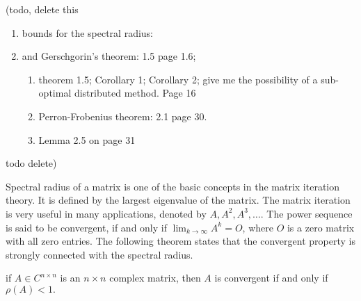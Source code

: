 (todo, delete this
\begin{enumerate}
\item bounds for the spectral radius: 
\item and Gerschgorin's theorem: 1.5 page 1.6; 

\begin{enumerate}
\item theorem 1.5; Corollary 1; Corollary 2; give me the possibility of
a sub-optimal distributed method. Page 16
\item Perron-Frobenius theorem: 2.1 page 30.
\item Lemma 2.5 on page 31 \cite{Varga2010}
\end{enumerate}
\end{enumerate}
todo delete)

Spectral radius of a matrix is one of the basic concepts in the matrix
iteration theory. It is defined by the largest eigenvalue of the matrix.
The matrix iteration is very useful in many applications, denoted
by $A,A^{2},A^{3},\ldots$. The power sequence is said to be convergent,
if and only if $\lim_{k\to\infty}A^{k}=O$, where $O$ is a zero matrix
with all zero entries. The following theorem states that the convergent
property is strongly connected with the spectral radius. 
\begin{thm}
\label{thm:Convergent <=00003D> p(A)<1} if $A\in C^{n\times n}$
is an $n\times n$ complex matrix, then $A$ is convergent if and
only if $\rho\left(A\right)<1.$\end{thm}
